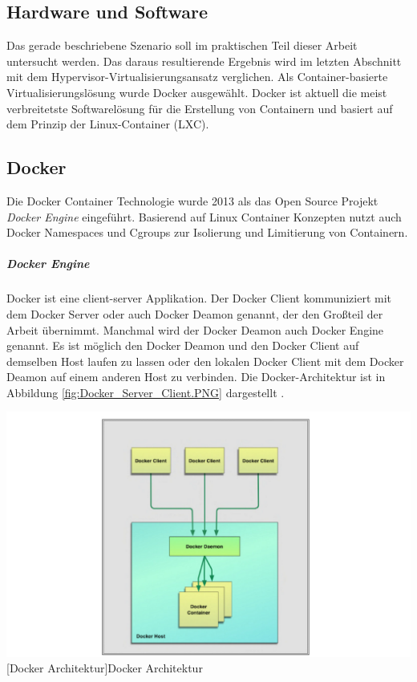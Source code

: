 \subsection{Hardware und Software}

Das gerade beschriebene Szenario soll im praktischen Teil dieser Arbeit untersucht werden. Das daraus resultierende Ergebnis wird im letzten Abschnitt mit dem Hypervisor-Virtualisierungsansatz verglichen. Als Container-basierte Virtualisierungslösung wurde Docker ausgewählt. Docker ist aktuell die meist verbreitetste Softwarelösung für die Erstellung von Containern und basiert auf dem Prinzip der Linux-Container (LXC).




\pagebreak
\subsection{Docker}
Die Docker Container Technologie wurde 2013 als das Open Source Projekt \emph{Docker Engine} eingeführt. Basierend auf Linux Container Konzepten nutzt auch Docker Namespaces und Cgroups zur Isolierung und Limitierung von Containern.  

\subparagraph{Docker Engine}
Docker ist eine client-server Applikation. Der Docker Client kommuniziert mit dem Docker Server oder auch Docker Deamon genannt, der den Großteil der Arbeit übernimmt. Manchmal wird der Docker Deamon auch Docker Engine genannt. Es ist möglich den Docker Deamon und den Docker Client auf demselben Host laufen zu lassen oder den lokalen Docker Client mit dem Docker Deamon auf einem anderen Host zu verbinden. Die Docker-Architektur ist in Abbildung \ref{fig:Docker_Server_Client.PNG} dargestellt \cite{Turnbull2015TheBook}.

\vspace{1em}
\begin{minipage}{\linewidth}
	\centering
	\includegraphics[width=1\linewidth]{pics/Docker_Server_Client.PNG}
	[Docker Architektur\cite{Turnbull2015TheBook}]{Docker Architektur}
	\label{fig:Docker_Server_Client.PNG}
\end{minipage}


